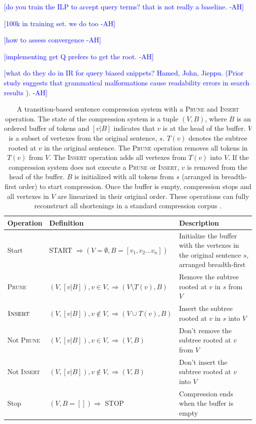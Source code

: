 \documentclass[11pt,a4paper]{article}
\newcommand{\ahcomment}[1]{\textcolor{blue}{[#1 -AH]}}
\begin{document}
\ahcomment{do you train the ILP to accept query terms? that is not really a baseline. }

\ahcomment{100k in training set. we do too }

\ahcomment{how to assess convergence}

\ahcomment{implementing get Q prefers to get the root. }


\ahcomment{what do they do in IR for query biased snippets? Hamed, John, Jieppu.
 (Prior study suggests that grammatical malformations cause readability errors in search results \cite{kanungo2009predicting}).}


\begin{table}[]
\centering
\begin{tabular}{llp{70mm}}
\textbf{Operation} &             \textbf{Definition}                                                    &      \textbf{Description}    \\ \hline
Start      & START $\Rightarrow ( V=\emptyset,  B=[v_1, v_2 ... v_n])$ & Initialize the buffer with the vertexes in the original sentence $s$, arranged breadth-first \\ \hline
\textsc{Prune}              & $(V, [v|B]), v \in V,  \Rightarrow (V \setminus  T(v), B)$ & Remove the subtree rooted at $v$ in $s$ from $V$ \\  
$\textsc{Insert}$             & $(V, [v|B]), v \notin V, \Rightarrow (V \cup T(v), B)$ & Insert the subtree rooted at $v$ in $s$ into $V$  \\ \hline
Not \textsc{Prune}           & $(V, [v|B]), v \in V, \Rightarrow (V, B)$ & Don't remove the subtree rooted at $v$ from $V$  \\ 
Not \textsc{Insert}          &       $(V, [v|B]), v \notin V, \Rightarrow (V, B)$ &   Don't insert the subtree rooted at $v$ into $V$    \\ \hline
Stop             & $ (V, B=[]) \Rightarrow$ STOP & Compression ends when the buffer is empty \\                                               
\end{tabular}
\caption{A transition-based sentence compression system with a \textsc{Prune} and \textsc{Insert} operation. The state of the compression system is a tuple $(V, B)$, where $B$ is an ordered buffer of tokens and $[v|B]$ indicates that $v$ is at the head of the buffer. $V$ is a subset of vertexes from the original sentence, $s$. $T(v)$ denotes the subtree rooted at $v$ in the original sentence. The \textsc{Prune} operation removes all tokens in $T(v)$ from $V$. The \textsc{Insert} operation adds all vertexes from $T(v)$ into $V$. If the compression system does not execute a \textsc{Prune} or \textsc{Insert}, $v$ is removed from the head of the buffer. $B$ is initialized with all tokens from $s$ (arranged in breadth-first order) to start compression. Once the buffer is empty, compression stops and all vertexes in $V$ are linearized in their original order. These operations can fully reconstruct all shortenings in a standard compression corpus \cite{filippova2013overcoming}.}
\end{table}
\end{document}
